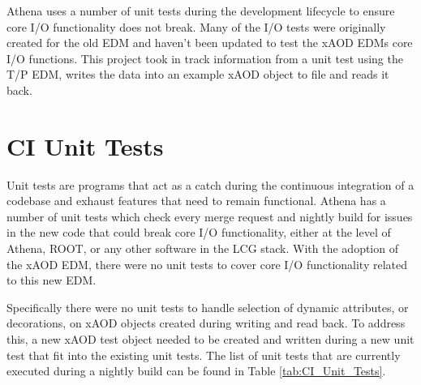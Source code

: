 Athena uses a number of unit tests during the development lifecycle to ensure core I/O functionality does not break.
Many of the I/O tests were originally created for the old EDM and haven't been updated to test the xAOD EDMs core I/O functions.
This project took in track information from a unit test using the T/P EDM, writes the data into an example xAOD object to file and reads it back.

\section{CI Unit Tests}
Unit tests are programs that act as a catch during the continuous integration of a codebase and exhaust features that need to remain functional. 
Athena has a number of unit tests which check every merge request and nightly build for issues in the new code that could break core I/O functionality, either at the level of Athena, ROOT, or any other software in the LCG stack.
With the adoption of the xAOD EDM, there were no unit tests to cover core I/O functionality related to this new EDM. 

Specifically there were no unit tests to handle selection of dynamic attributes, or decorations, on xAOD objects created during writing and read back.
To address this, a new xAOD test object needed to be created and written during a new unit test that fit into the existing unit tests.
The list of unit tests that are currently executed during a nightly build can be found in Table \ref{tab:CI_Unit_Tests}.


